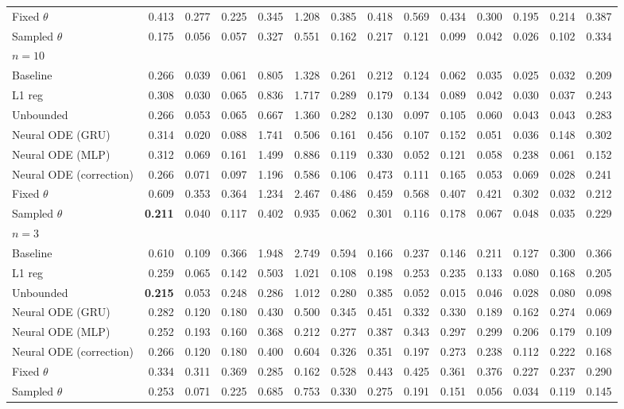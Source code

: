 \begin{tabular}{lrrrrrrrrrrrrr}
Fixed $\theta$ & 0.413 & 0.277 & 0.225 & 0.345 & 1.208 & 0.385 & 0.418 & 0.569 & 0.434 & 0.300 & 0.195 & 0.214 & 0.387 \\
Sampled $\theta$ & 0.175 & 0.056 & 0.057 & 0.327 & 0.551 & 0.162 & 0.217 & 0.121 & 0.099 & 0.042 & 0.026 & 0.102 & 0.334 \\
\midrule
\multicolumn{14}{l}{\textbf{$n=10$}} \\
Baseline & 0.266 & 0.039 & 0.061 & 0.805 & 1.328 & 0.261 & 0.212 & 0.124 & 0.062 & 0.035 & 0.025 & 0.032 & 0.209 \\
L1 reg & 0.308 & 0.030 & 0.065 & 0.836 & 1.717 & 0.289 & 0.179 & 0.134 & 0.089 & 0.042 & 0.030 & 0.037 & 0.243 \\
Unbounded & 0.266 & 0.053 & 0.065 & 0.667 & 1.360 & 0.282 & 0.130 & 0.097 & 0.105 & 0.060 & 0.043 & 0.043 & 0.283 \\
Neural ODE (GRU) & 0.314 & 0.020 & 0.088 & 1.741 & 0.506 & 0.161 & 0.456 & 0.107 & 0.152 & 0.051 & 0.036 & 0.148 & 0.302 \\
Neural ODE (MLP) & 0.312 & 0.069 & 0.161 & 1.499 & 0.886 & 0.119 & 0.330 & 0.052 & 0.121 & 0.058 & 0.238 & 0.061 & 0.152 \\
Neural ODE (correction) & 0.266 & 0.071 & 0.097 & 1.196 & 0.586 & 0.106 & 0.473 & 0.111 & 0.165 & 0.053 & 0.069 & 0.028 & 0.241 \\
Fixed $\theta$ & 0.609 & 0.353 & 0.364 & 1.234 & 2.467 & 0.486 & 0.459 & 0.568 & 0.407 & 0.421 & 0.302 & 0.032 & 0.212 \\
Sampled $\theta$ & \textbf{0.211} & 0.040 & 0.117 & 0.402 & 0.935 & 0.062 & 0.301 & 0.116 & 0.178 & 0.067 & 0.048 & 0.035 & 0.229 \\
\midrule
\multicolumn{14}{l}{\textbf{$n=3$}} \\
Baseline & 0.610 & 0.109 & 0.366 & 1.948 & 2.749 & 0.594 & 0.166 & 0.237 & 0.146 & 0.211 & 0.127 & 0.300 & 0.366 \\
L1 reg & 0.259 & 0.065 & 0.142 & 0.503 & 1.021 & 0.108 & 0.198 & 0.253 & 0.235 & 0.133 & 0.080 & 0.168 & 0.205 \\
Unbounded & \textbf{0.215} & 0.053 & 0.248 & 0.286 & 1.012 & 0.280 & 0.385 & 0.052 & 0.015 & 0.046 & 0.028 & 0.080 & 0.098 \\
Neural ODE (GRU) & 0.282 & 0.120 & 0.180 & 0.430 & 0.500 & 0.345 & 0.451 & 0.332 & 0.330 & 0.189 & 0.162 & 0.274 & 0.069 \\
Neural ODE (MLP) & 0.252 & 0.193 & 0.160 & 0.368 & 0.212 & 0.277 & 0.387 & 0.343 & 0.297 & 0.299 & 0.206 & 0.179 & 0.109 \\
Neural ODE (correction) & 0.266 & 0.120 & 0.180 & 0.400 & 0.604 & 0.326 & 0.351 & 0.197 & 0.273 & 0.238 & 0.112 & 0.222 & 0.168 \\
Fixed $\theta$ & 0.334 & 0.311 & 0.369 & 0.285 & 0.162 & 0.528 & 0.443 & 0.425 & 0.361 & 0.376 & 0.227 & 0.237 & 0.290 \\
Sampled $\theta$ & 0.253 & 0.071 & 0.225 & 0.685 & 0.753 & 0.330 & 0.275 & 0.191 & 0.151 & 0.056 & 0.034 & 0.119 & 0.145 \\
\bottomrule
\end{tabular}
